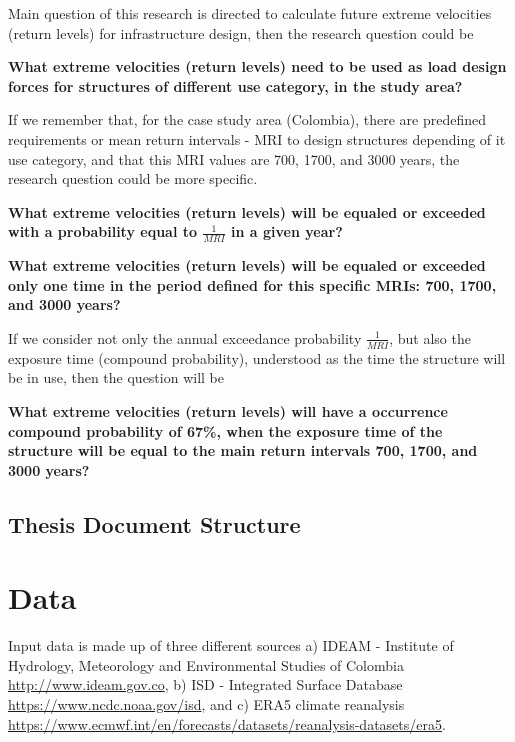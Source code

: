 \documentclass[12pt,oneside]{reedthesis}
\begin{document}
Main question of this research is directed to calculate future extreme velocities (return levels) for infrastructure design, then the research question could be

\textbf{What extreme velocities (return levels) need to be used as load design forces for structures of different use category, in the study area?}

If we remember that, for the case study area (Colombia), there are predefined requirements or mean return intervals - MRI to design structures depending of it use category, and that this MRI values are 700, 1700, and 3000 years, the research question could be more specific.

\textbf{What extreme velocities (return levels) will be equaled or exceeded with a probability equal to \(\frac{1}{MRI}\) in a given year?}

\textbf{What extreme velocities (return levels) will be equaled or exceeded only one time in the period defined for this specific MRIs: 700, 1700, and 3000 years?}

If we consider not only the annual exceedance probability \(\frac{1}{MRI}\), but also the exposure time (compound probability), understood as the time the structure will be in use, then the question will be

\textbf{What extreme velocities (return levels) will have a occurrence compound probability of 67\%, when the exposure time of the structure will be equal to the main return intervals 700, 1700, and 3000 years?}

\hypertarget{thesis-document-structure}{%
\section{Thesis Document Structure}\label{thesis-document-structure}}

\hypertarget{rmd-data}{%
\chapter{Data}\label{rmd-data}}

Input data is made up of three different sources a) IDEAM - Institute of Hydrology, Meteorology and Environmental Studies of Colombia \url{http://www.ideam.gov.co}, b) ISD - Integrated Surface Database \url{https://www.ncdc.noaa.gov/isd}, and c) ERA5 climate reanalysis \url{https://www.ecmwf.int/en/forecasts/datasets/reanalysis-datasets/era5}.
\end{document}
